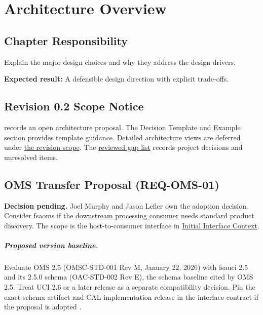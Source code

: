 \chapter{Architecture Overview}
\section{Chapter Responsibility}
\label{Section:ArchitectureOverviewResponsibility}
Explain the major design choices and why they address the design drivers.

\noindent\textbf{Expected result:} A defensible design direction with explicit trade-offs.

\section{Revision 0.2 Scope Notice}
\label{Section:DeferredArchitectureOverview}
\begin{fsaNote}
 records an open architecture proposal.
The Decision Template and Example section provides template guidance.
Detailed architecture views are deferred under
\hyperref[Section:ProjectScope]{the revision scope}. The
\hyperref[Table:ProjectGapReview]{reviewed gap list} records project decisions
and unresolved items.
\end{fsaNote}

\section{OMS Transfer Proposal (REQ-OMS-01)}
\label{Proposal:REQ-OMS-01}
\noindent\textbf{Decision pending.} Joel Murphy and Jason Lefler own the
adoption decision. Consider \gls{fsaoms} if the
\hyperref[Dependency:Consumer]{downstream processing consumer} needs standard
product discovery. The scope is the host-to-consumer interface in
\hyperref[Table:ProjectInterfaces]{Initial Interface Context}.

\paragraph{Proposed version baseline.}
Evaluate OMS 2.5 (OMSC-STD-001 Rev M, January 22, 2026) with \gls{fsauci}
2.5 and its 2.5.0 schema (OAC-STD-002 Rev E), the schema baseline cited by OMS
2.5. Treat UCI 2.6 or a later release as a separate compatibility decision.
Pin the exact schema artifact and CAL implementation release in the interface
contract if the proposal is adopted \cite{OMSStandard25,UCIRelease26}.

